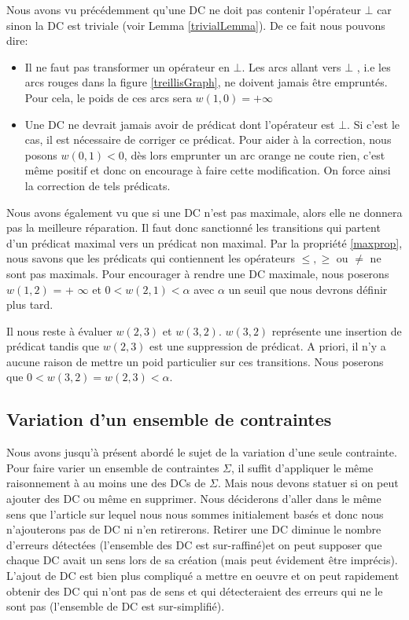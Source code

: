 \documentclass[letterpaper, 12pt]{report}
\theoremstyle{definition}
\begin{document}
Nous avons vu précédemment qu'une DC ne doit pas contenir l'opérateur $\bot$ car sinon la DC est triviale (voir Lemma \ref{trivialLemma}). De ce fait nous pouvons dire:

\begin{itemize}
	\item Il ne faut pas transformer un opérateur en $\bot$. Les arcs allant vers $\bot$ , i.e les arcs rouges dans la figure \ref{treillisGraph}, ne doivent jamais être empruntés. Pour cela, le poids de ces arcs sera $w(1,0)= + \infty$
	\item Une DC ne devrait jamais avoir de prédicat dont l'opérateur est $\bot$. Si c'est le cas, il est nécessaire de corriger ce prédicat. Pour aider à la correction, nous posons $w(0,1) < 0$, dès lors emprunter un arc orange ne coute rien, c'est même positif et donc on encourage à faire cette modification. On force ainsi la correction de tels prédicats.
\end{itemize}

Nous avons également vu que si une DC n'est pas maximale, alors elle ne donnera pas la meilleure réparation. Il faut donc sanctionné les transitions qui partent d'un prédicat maximal vers un prédicat non maximal. Par la propriété \ref{maxprop}, nous savons que les prédicats qui contiennent les opérateurs $\leq, \geq$ ou $\neq$ ne sont pas maximals. Pour encourager à rendre une DC maximale, nous poserons $w(1,2)$ = + $\infty$ et $0 < w(2,1) <\alpha$ avec $\alpha$ un seuil que nous devrons définir plus tard.

Il nous reste à évaluer $w(2,3)$ et $w(3,2)$. $w(3,2)$ représente une insertion de prédicat tandis que $w(2,3)$ est une suppression de prédicat. A priori, il n'y a aucune raison de mettre un poid particulier sur ces transitions. Nous poserons que $0 < w(3,2)  = w(2,3) < \alpha$.

\subsection{Variation d'un ensemble de contraintes}

Nous avons jusqu'à présent abordé le sujet de la variation d'une seule contrainte. Pour faire varier un ensemble de contraintes $\Sigma$, il suffit d'appliquer le même raisonnement à au moins une des DCs de $\Sigma$. Mais nous devons statuer si on peut ajouter des DC ou même en supprimer. Nous déciderons d'aller dans le même sens que l'article sur lequel nous nous sommes initialement basés \cite{bcss} et donc nous n'ajouterons pas de DC ni n'en retirerons. Retirer une DC diminue le nombre d'erreurs détectées (l'ensemble des DC est sur-raffiné)et on peut supposer que chaque DC avait un sens lors de sa création (mais peut évidement être imprécis). L'ajout de DC est bien plus compliqué a mettre en oeuvre et on peut rapidement obtenir des DC qui n'ont pas de sens et qui détecteraient des erreurs qui ne le sont pas (l'ensemble de DC est sur-simplifié).
\end{document}
